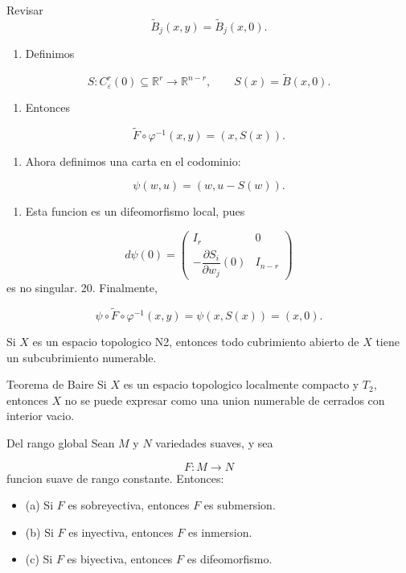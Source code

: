 \begin{bookproof}{Revisar}
\[
\widetilde B_j(x,y)=\widetilde B_j(x,0).
\]
\begin{enumerate}[start=16]
\item Definimos
\end{enumerate}
\[
S:C_\varepsilon^r(0)\subseteq\mathbb R^r\to\mathbb R^{n-r},\qquad S(x)=\widetilde B(x,0).
\]
\begin{enumerate}[start=17]
\item Entonces
\end{enumerate}
\[
\widetilde F\circ\varphi^{-1}(x,y)=(x,S(x)).
\]
\begin{enumerate}[start=18]
\item Ahora definimos una carta en el codominio:
\end{enumerate}
\[
\psi(w,u)=(w,u-S(w)).
\]
\begin{enumerate}[start=19]
\item Esta funcion es un difeomorfismo local, pues
\end{enumerate}
\[
d\psi(0)=\begin{pmatrix} I_r & 0\\-\dfrac{\partial S_i}{\partial w_j}(0) & I_{n-r}\end{pmatrix}
\]
es no singular. 20. Finalmente,

\[
\psi\circ\widetilde F\circ\varphi^{-1}(x,y)=\psi(x,S(x))=(x,0).
\]
\bookqed
\end{bookproof}
\begin{bookproposition}{}
Si $X$ es un espacio topologico N2, entonces todo cubrimiento abierto de $X$ tiene un subcubrimiento numerable.

\end{bookproposition}
\begin{booktheorem}{Teorema de Baire}
Si $X$ es un espacio topologico localmente compacto y $T_2$, entonces $X$ no se puede expresar como una union numerable de cerrados con interior vacio.

\end{booktheorem}
\begin{booktheorem}{Del rango global}
Sean $M$ y $N$ variedades suaves, y sea

\[
F:M\to N
\]
funcion suave de rango constante. Entonces:

\begin{itemize}
\item (a)  Si $F$ es sobreyectiva, entonces $F$ es submersion.
\item (b)  Si $F$ es inyectiva, entonces $F$ es inmersion.
\item (c)  Si $F$ es biyectiva, entonces $F$ es difeomorfismo.
\end{itemize}
\end{booktheorem}
